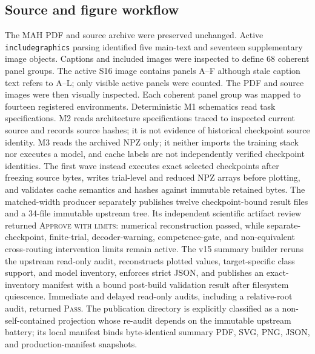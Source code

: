 \documentclass[11pt,a4paper]{article}
\begin{document}
\subsection{Source and figure workflow}\label{sec:source-workflow}
The MAH PDF and source archive were preserved unchanged. Active \verb|includegraphics| parsing identified five main-text and seventeen supplementary image objects. Captions and included images were inspected to define 68 coherent panel groups. The active S16 image contains panels A--F although stale caption text refers to A--L; only visible active panels were counted. The PDF and source images were then visually inspected. Each coherent panel group was mapped to fourteen registered environments. Deterministic M1 schematics read task specifications. M2 reads architecture specifications traced to inspected current source and records source hashes; it is not evidence of historical checkpoint source identity. M3 reads the archived NPZ only; it neither imports the training stack nor executes a model, and cache labels are not independently verified checkpoint identities. The first wave instead executes exact selected checkpoints after freezing source bytes, writes trial-level and reduced NPZ arrays before plotting, and validates cache semantics and hashes against immutable retained bytes. The matched-width producer separately publishes twelve checkpoint-bound result files and a 34-file immutable upstream tree. Its independent scientific artifact review returned \textsc{Approve with limits}: numerical reconstruction passed, while separate-checkpoint, finite-trial, decoder-warning, competence-gate, and non-equivalent cross-routing intervention limits remain active. The v15 summary builder reruns the upstream read-only audit, reconstructs plotted values, target-specific class support, and model inventory, enforces strict JSON, and publishes an exact-inventory manifest with a bound post-build validation result after filesystem quiescence. Immediate and delayed read-only audits, including a relative-root audit, returned \textsc{Pass}. The publication directory is explicitly classified as a non-self-contained projection whose re-audit depends on the immutable upstream battery; its local manifest binds byte-identical summary PDF, SVG, PNG, JSON, and production-manifest snapshots.
\end{document}
